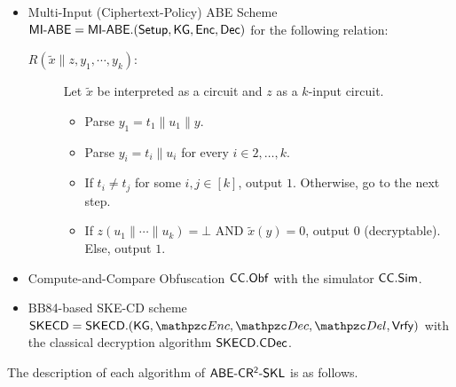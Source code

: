 \begin{itemize}
\item Multi-Input (Ciphertext-Policy) ABE Scheme $\mathsf{MI}\textrm{-}\mathsf{ABE} =
\mathsf{MI}\textrm{-}\mathsf{ABE}.(\mathsf{Setup}, \mathsf{KG},\allowbreak \mathsf{Enc}, \mathsf{Dec})$ for the following relation:

\begin{description}
    \item[$R(\widetilde{x} \| z,y_1, \cdots, y_k)$:] Let $\widetilde{x}$ be
interpreted as a circuit and $z$ as a $k$-input circuit.
\begin{itemize}
\item Parse $y_1 = t_1 \| u_1 \| y$.
\item Parse $y_i=t_i\|u_i$ for every $i\in 2, \ldots, k$.
\item If $t_i\ne t_j$ for some $i,j\in[k]$, output $1$. Otherwise, go to the next step.
\item If $z(u_1\|\cdots\|u_k) = \bot$ AND $\widetilde{x}(y) = 0$, output $0$
(decryptable). Else, output $1$.
\end{itemize}
\end{description}

\item Compute-and-Compare Obfuscation $\mathsf{CC}.\mathsf{Obf}$ with the simulator
$\mathsf{CC}.\mathsf{Sim}$.

\item BB84-based SKE-CD scheme $\SKECD =
\SKECD.(\KG,\qEnc,\qDec,\qDel,\Vrfy)$ with the classical
decryption algorithm $\mathsf{SKECD}.\mathsf{CDec}$.
\end{itemize}

The description of each algorithm of $\mathsf{ABE}\textrm{-}\mathsf{CR^2}\textrm{-}\mathsf{SKL}$ is as follows.

